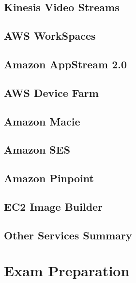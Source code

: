 \documentclass[11pt]{book}
\begin{document}
    \section{Kinesis Video Streams}


    \section{AWS WorkSpaces}


    \section{Amazon AppStream 2.0}


    \section{AWS Device Farm}


    \section{Amazon Macie}


    \section{Amazon SES}


    \section{Amazon Pinpoint}


    \section{EC2 Image Builder}


    \section{Other Services Summary}


    \chapter{Exam Preparation}
\end{document}
